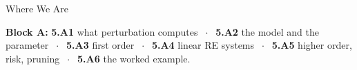 

\graphicspath{{./figures/}}





\makedecktitle

\begin{frame}{Where We Are}
\vspace{-1mm}
\begin{center}
\small \textbf{Block A:} \textbf{5.A1} what perturbation computes $\;\cdot\;$ \textbf{5.A2} the model and the parameter $\;\cdot\;$ \textbf{5.A3} first order $\;\cdot\;$ \textbf{5.A4} linear RE systems $\;\cdot\;$ \textbf{5.A5} higher order, risk, pruning $\;\cdot\;$ \textbf{5.A6} the worked example.
\end{center}
\end{frame}

